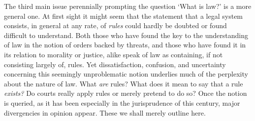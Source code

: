 The third main issue perennially prompting the question `What is law?'
is a more general one. At first sight it might seem that the statement
that a legal system consists, in general at any rate, of \emph{rules}
could hardly be doubted or found difficult to understand. Both those who
have found the key to the understanding of law in the notion of orders
backed by threats, and those who have found it in its relation to
morality or justice, alike speak of law as containing, if not consisting
largely of, rules. Yet dissatisfaction, confusion, and uncertainty
concerning this seemingly unproblematic notion underlies much of the
perplexity about the nature of law. What \emph{are} rules? What does it
mean to say that a rule \emph{exists?} Do courts really apply rules or
merely pretend to do so? Once the notion is queried, as it has been
especially in the jurisprudence of this century, major divergencies in
opinion appear. These we shall merely outline here.

